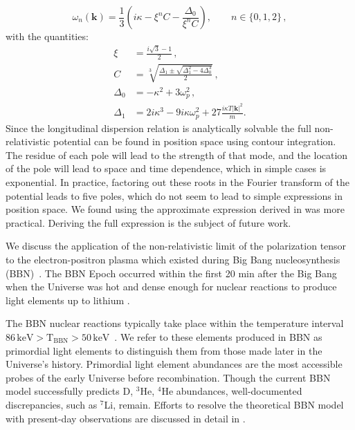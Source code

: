 \begin{equation}\label{eq:cardano}
\omega_n(\boldsymbol{k}) = \frac{1}{3}\left(i\kappa-\xi^n C-\frac{\Delta_0}{\xi^n C}\right), \qquad n \in \{0,1,2\} \,,
\end{equation}
with the quantities:
\begin{align}\label{eq:delta}
  \xi &=\frac{i\sqrt{3}-1}{2}\,,\\
    C &= \sqrt[3]{\frac{\Delta_1 \pm \sqrt{\Delta_1^2 - 4 \Delta_0^3}}2}\,,\\
    \Delta_0 &= -\kappa^2 + 3 \omega_p^2\,,\\
\Delta_1 &= 2i\kappa^3 - 9 i\kappa \omega_p^2 + 27\frac{i\kappa T |\boldsymbol{k}|^2}{m}.
\end{align}
Since the longitudinal dispersion relation is analytically solvable the full non-relativistic potential can be found in position space using contour integration. The residue of each pole will lead to the strength of that mode, and the location of the pole will lead to space and time dependence, which in simple cases is exponential. In practice, factoring out these roots in the Fourier transform of the potential leads to five poles, which do not seem to lead to simple expressions in position space. We found using the approximate expression derived in  was more practical. Deriving the full expression is the subject of future work.


We discuss the application of the non-relativistic limit of the polarization tensor  to the electron-positron plasma which existed during Big Bang nucleosynthesis (BBN)~\cite{Grayson:2023flr}. The BBN Epoch occurred within the first 20 min after the Big Bang when the Universe was hot and dense enough for nuclear reactions to produce light elements up to lithium \cite{Pitrou:2018cgg}. 

The BBN nuclear reactions typically take place within the temperature interval $86\, \mathrm{keV}>\mathrm{T_{BBN}}>50\, \mathrm{keV}$~\cite{Pitrou:2018cgg}. We refer to these elements produced in BBN as primordial light elements to distinguish them from those made later in the Universe's history. Primordial light element abundances are the most accessible probes of the early Universe before recombination. Though the current BBN model successfully predicts D, $^3$He, $^4$He abundances, well-documented discrepancies, such as $^7$Li, remain. Efforts to resolve the theoretical BBN model with present-day observations are discussed in detail in \cite{Pitrou:2021vqr,Bertulani:2022qly}.

